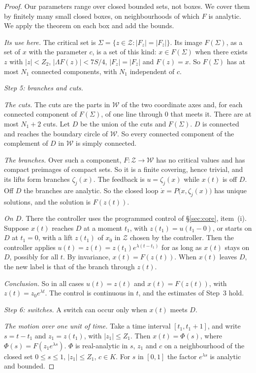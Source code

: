 \documentclass[11pt,reqno]{amsart}
\theoremstyle{plain}
\theoremstyle{definition}
\theoremstyle{remark}
\newcommand{\Sig}{\Sigma}
\begin{document}
\begin{proof}
Our parameters range over closed bounded sets, not boxes. We cover them by finitely many small closed boxes, on neighbourhoods of which $F$ is analytic. We apply the theorem on each box and add the bounds.

\emph{Its use here.} The critical set is $\Sig=\{z\in \mathcal Z:|F_z|=|F_{\bar z}|\}$. Its image $F(\Sig)$, as a set of $x$ with the parameter $c$, is a set of this kind: $x\in F(\Sig)$ when there exists $z$ with $|z|<Z_2$, $|\Lambda F(z)|<7S/4$, $|F_z|=|F_{\bar z}|$ and $F(z)=x$. So $F(\Sig)$ has at most $N_1$ connected components, with $N_1$ independent of $c$.

\emph{Step 5: branches and cuts.}

\emph{The cuts.} The cuts are the parts in $\mathcal W$ of the two coordinate axes and, for each connected component of $F(\Sig)$, of one line through $0$ that meets it. There are at most $N_1+2$ cuts. Let $D$ be the union of the cuts and $F(\Sig)$. $D$ is connected and reaches the boundary circle of $\mathcal W$. So every connected component of the complement of $D$ in $\mathcal W$ is simply connected.

\emph{The branches.} Over such a component, $F\colon \mathcal Z\to\mathcal W$ has no critical values and has compact preimages of compact sets. So it is a finite covering, hence trivial, and its lifts form branches $\zeta_j(x)$. The feedback is $u=\zeta_j(x)$ while $x(t)$ is off $D$. Off $D$ the branches are analytic. So the closed loop $\dot x=P\bigl(x,\zeta_j(x)\bigr)$ has unique solutions, and the solution is $F(z(t))$.

\emph{On $D$.} There the controller uses the programmed control of \S\ref{sec:core}, item~(i). Suppose $x(t)$ reaches $D$ at a moment $t_1$, with $z(t_1)=u(t_1-0)$, or starts on $D$ at $t_1=0$, with a lift $z(t_1)$ of $x_0$ in $\mathcal Z$ chosen by the controller. Then the controller applies $u(t)=z(t)=z(t_1)e^{\lambda(t-t_1)}$ for as long as $x(t)$ stays on $D$, possibly for all $t$. By invariance, $x(t)=F(z(t))$. When $x(t)$ leaves $D$, the new label is that of the branch through $z(t)$.

\emph{Conclusion.} So in all cases $u(t)=z(t)$ and $x(t)=F(z(t))$, with $z(t)=z_0e^{\lambda t}$. The control is continuous in $t$, and the estimates of Step~3 hold.

\emph{Step 6: switches.} A switch can occur only when $x(t)$ meets $D$.

\emph{The motion over one unit of time.} Take a time interval $[t_1,t_1+1]$, and write $s=t-t_1$ and $z_1=z(t_1)$, with $|z_1|\le Z_1$. Then $x(t)=\Phi(s)$, where $\Phi(s)=F(z_1e^{\lambda s})$. $\Phi$ is real-analytic in $s$, $z_1$ and $c$ on a neighbourhood of the closed set $0\le s\le1$, $|z_1|\le Z_1$, $c\in K$. For $s$ in $[0,1]$ the factor $e^{\lambda s}$ is analytic and bounded.


\end{proof}
\end{document}
